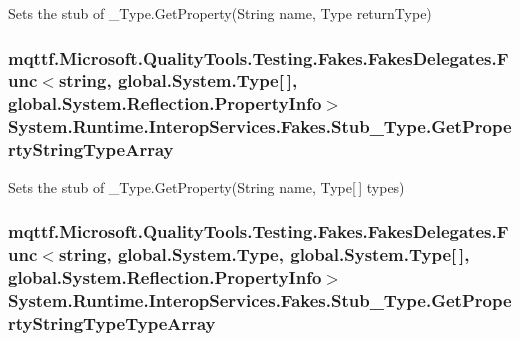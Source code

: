 Sets the stub of \-\_\-\-Type.\-Get\-Property(\-String name, Type return\-Type)

\hypertarget{class_system_1_1_runtime_1_1_interop_services_1_1_fakes_1_1_stub___type_af5d702b35923f1f39b39fb231deada16}{
\subsubsection[{Get\-Property\-String\-Type\-Array}]{\setlength{\rightskip}{0pt plus 5cm}mqttf.\-Microsoft.\-Quality\-Tools.\-Testing.\-Fakes.\-Fakes\-Delegates.\-Func$<$string, global.\-System.\-Type\mbox{[}$\,$\mbox{]}, global.\-System.\-Reflection.\-Property\-Info$>$ System.\-Runtime.\-Interop\-Services.\-Fakes.\-Stub\-\_\-\-Type.\-Get\-Property\-String\-Type\-Array}}\label{class_system_1_1_runtime_1_1_interop_services_1_1_fakes_1_1_stub___type_af5d702b35923f1f39b39fb231deada16}


Sets the stub of \-\_\-\-Type.\-Get\-Property(\-String name, Type\mbox{[}$\,$\mbox{]} types)

\hypertarget{class_system_1_1_runtime_1_1_interop_services_1_1_fakes_1_1_stub___type_a3c292feb9adac737398f56d06498bf36}{
\subsubsection[{Get\-Property\-String\-Type\-Type\-Array}]{\setlength{\rightskip}{0pt plus 5cm}mqttf.\-Microsoft.\-Quality\-Tools.\-Testing.\-Fakes.\-Fakes\-Delegates.\-Func$<$string, global.\-System.\-Type, global.\-System.\-Type\mbox{[}$\,$\mbox{]}, global.\-System.\-Reflection.\-Property\-Info$>$ System.\-Runtime.\-Interop\-Services.\-Fakes.\-Stub\-\_\-\-Type.\-Get\-Property\-String\-Type\-Type\-Array}}\label{class_system_1_1_runtime_1_1_interop_services_1_1_fakes_1_1_stub___type_a3c292feb9adac737398f56d06498bf36}


